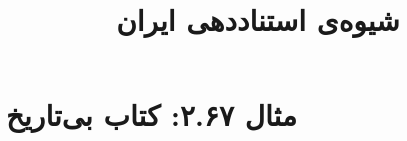 \documentclass[a4paper,10pt]{article}
\begin{document}
\title{شیوه‌ی استناددهی ایران
 }
\author{}
\date{}
\maketitle



\section*{مثال ۲.۶۷: کتاب بی‌تاریخ}

\cite{اخوی}\\
\cite{پورممتاز1381}\\
\cite{turabian}\\
\cite{kafka1926}\\






\end{document}
